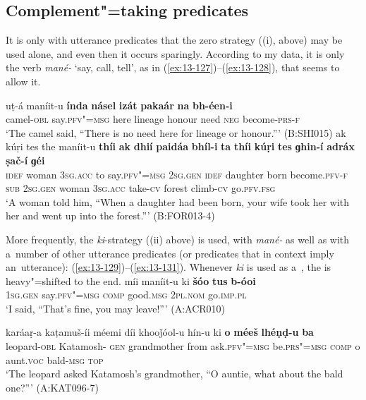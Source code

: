 \subsection{Complement"=taking  predicates}
\label{subsec:13-5-1}

 It is only with utterance predicates that the zero strategy ((i), above) may be used alone, and even then it occurs sparingly. According to my data, it is only the verb \textit{mané-} `say, call, tell', as in (\ref{ex:13-127})--(\ref{ex:13-128}), that seems to allow it.

\ea
\label{ex:13-127}
\gll uṭ-á maníit-u \textbf{índa} \textbf{násel} \textbf{izát} \textbf{pakaár} \textbf{na} \textbf{bh-éen-i}\\
camel-\textsc{obl} say.\textsc{pfv"=msg} here lineage honour need \textsc{neg} become-\textsc{prs-f}\\
\glt `The camel said, ``There is no need here for lineage or honour.''' (B:SHI015)
\ex
\label{ex:13-128}
\gll ak kúṛi tes the maníit-u \textbf{thíi} \textbf{ak} \textbf{dhií} \textbf{paidáa} \textbf{bhíl-i} \textbf{ta} \textbf{thíi} \textbf{kúṛi} \textbf{tes} \textbf{ɡhin-í} \textbf{adráx} \textbf{ṣač-í} \textbf{ɡéi}\\
\textsc{idef} woman \textsc{3sg.acc} to say.\textsc{pfv"=msg} \textsc{2sg.gen} \textsc{idef} daughter born become.\textsc{pfv-f} \textsc{sub} \textsc{2sg.gen} woman \textsc{3sg.acc} take-\textsc{cv} forest climb-\textsc{cv} go.\textsc{pfv.fsg}\\
\glt `A woman told him, ``When a daughter had been born, your wife took her with her and went up into the forest.''' (B:FOR013-4) 
\z

More frequently, the \textit{ki}-strategy ((ii) above) is used, with \textit{mané-} as well as with a~number of other utterance predicates (or predicates that in context imply an~utterance): (\ref{ex:13-129})--(\ref{ex:13-131}). Whenever \textit{ki} is used as a~, the  is heavy"=shifted to the end.
\largerpage
\ea
\label{ex:13-129}
\gll míi maníit-u ki \textbf{šóo} \textbf{tus} \textbf{b-óoi}  \\
\textsc{1sg.gen} say.\textsc{pfv"=msg} \textsc{comp} good.\textsc{msg} \textsc{2pl.nom} go.\textsc{imp.pl} \\
\glt `I said, ``That's fine, you may leave!''' (A:ACR010)

\ex
\label{ex:13-130}
\gll karáaṛ-a kaṭamuš-íi méemi díi khooǰóol-u hín-u ki \textbf{o} \textbf{méeš} \textbf{lhéṇḍ-u} \textbf{ba}\\
leopard-\textsc{obl} Katamosh-\textsc{ gen} grandmother from ask.\textsc{pfv"=msg} be.\textsc{prs"=msg} \textsc{comp} o aunt.\textsc{voc} bald-\textsc{msg} \textsc{top}\\
\glt `The leopard asked Katamosh's grandmother, ``O auntie, what about the bald one?''' (A:KAT096-7)

